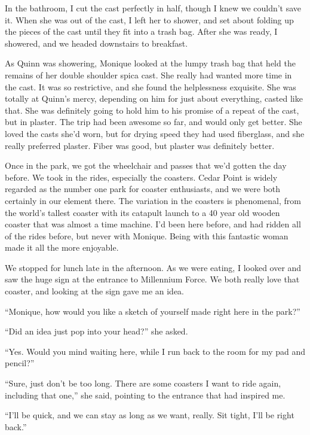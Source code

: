 In the bathroom, I cut the cast perfectly in half, though I knew we couldn't save it. When
she was out of the cast, I left her to shower, and set about folding up the pieces of the cast
until they fit into a trash bag. After she was ready, I showered, and we headed downstairs to
breakfast.

\begin{thought}
As Quinn was showering, Monique looked at the lumpy trash bag that held the remains of her
double shoulder spica cast. She really had wanted more time in the cast. It was so restrictive,
and she found the helplessness exquisite. She was totally at Quinn's mercy, depending on him for
just about everything, casted like that. She was definitely going to hold him to his promise of
a repeat of the cast, but in plaster. The trip had been awesome so far, and would only get
better. She loved the casts she'd worn, but for drying speed they had used fiberglass, and she
really preferred plaster. Fiber was good, but plaster was definitely better.
\end{thought}

Once in the park, we got the wheelchair and passes that we'd gotten the day before. We took
in the rides, especially the coasters. Cedar Point is widely regarded as the number one park for
coaster enthusiasts, and we were both certainly in our element there. The variation in the
coasters is phenomenal, from the world's tallest coaster with its catapult launch to a 40 year
old wooden coaster that was almost a time machine. I'd been here before, and had ridden all of
the rides before, but never with Monique. Being with this fantastic woman made it all the more
enjoyable.

We stopped for lunch late in the afternoon. As we were eating, I looked over and saw the
huge sign at the entrance to Millennium Force. We both really love that coaster, and looking at
the sign gave me an idea.

``Monique, how would you like a sketch of yourself made right here in the park?''

``Did an idea just pop into your head?'' she asked.

``Yes. Would you mind waiting here, while I run back to the room for my pad and pencil?''

``Sure, just don't be too long. There are some coasters I want to ride again, including that
one,'' she said, pointing to the entrance that had inspired me.

``I'll be quick, and we can stay as long as we want, really. Sit tight, I'll be right back.''

